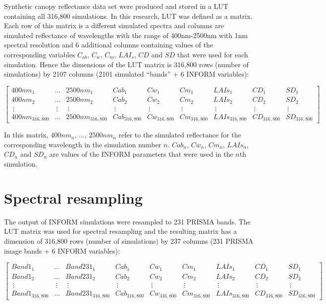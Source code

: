 \documentclass[a4paper, twoside]{templates/ociamthesis}
\begin{document}
Synthetic canopy reflectance data set were produced and stored in a LUT containing all 316,800 simulations. In this research, LUT was defined as a matrix. Each row of this matrix is a different simulated spectra and columns are simulated reflectance of wavelengths with the range of 400nm-2500nm with 1nm spectral resolution and 6 additional columns containing values of the corresponding variables \(C_{ab}\), \(C_{w}\), \(C_{m}\), \(LAI_{s}\), \(CD\) and \(SD\) that were used for each simulation. Hence the dimensions of the LUT matrix is 316,800 rows (number of simulations) by 2107 columns (2101 simulated ``bands'' + 6 INFORM variables):

\begingroup
\tiny

\[
\begin{bmatrix}
400nm_{1} & \dots & 2500nm_{1} & Cab_{1} & Cw_{1} & Cm_{1} & LAIs_{1} & CD_{1} & SD_{1}\\
400nm_{2} & \dots & 2500nm_{2} & Cab_{2} & Cw_{2} & Cm_{2} & LAIs_{2} & CD_{2} & SD_{2}\\
\ \vdots  &\ \vdots &\ \vdots &\ \vdots &\ \vdots &\ \vdots &\ \vdots &\ \vdots &\ \vdots\\
400nm_{316,800} & \dots & 2500nm_{316,800} & Cab_{316,800} & Cw_{316,800} & Cm_{316,800} & LAIs_{316,800} & CD_{316,800} & SD_{316,800}
\end{bmatrix}
\]
\endgroup

In this matrix, \(400nm_{n}\), \(\dots\), \(2500nm_{n}\) refer to the simulated reflectance for the corresponding wavelength in the simulation number \(n\). \(Cab_{n}\), \(Cw_{n}\), \(Cm_{n}\), \(LAIs_{n}\), \(CD_{n}\) and \(SD_{n}\) are values of the INFORM parameters that were used in the \(n\)th simulation.

\hypertarget{spectral-resampling-1}{%
\section{Spectral resampling}\label{spectral-resampling-1}}

The output of INFORM simulations were resampled to 231 PRISMA bands. The LUT matrix was used for spectral resampling and the resulting matrix has a dimension of 316,800 rows (number of simulations) by 237 columns (231 PRISMA image bands + 6 INFORM variables):

\begingroup
\tiny

\[
\begin{bmatrix}
Band1_{1} & \dots & Band231_{1} & Cab_{1} & Cw_{1} & Cm_{1} & LAIs_{1} & CD_{1} & SD_{1}\\
Band1_{2} & \dots & Band231_{2} & Cab_{2} & Cw_{2} & Cm_{2} & LAIs_{2} & CD_{2} & SD_{2}\\
\ \vdots  &\ \vdots &\ \vdots &\ \vdots &\ \vdots &\ \vdots &\ \vdots &\ \vdots &\ \vdots\\
Band1_{316,800} & \dots & Band231_{316,800} & Cab_{316,800} & Cw_{316,800} & Cm_{316,800} & LAIs_{316,800} & CD_{316,800} & SD_{316,800}
\end{bmatrix}
\]
\endgroup
\end{document}
